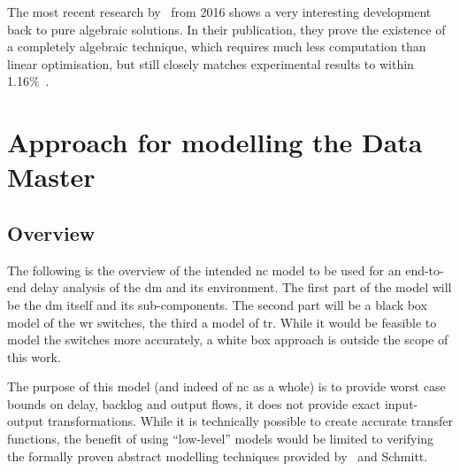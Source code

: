 The most recent research by~\citeauthor{bondorf_delay_2016} from 2016 shows a very interesting development back to pure algebraic solutions. In their publication, they prove the existence of a completely algebraic technique,
which requires much less computation than linear optimisation, but still closely matches experimental results to within 1.16\%~\cite{bondorf_delay_2016}.


\section{Approach for modelling the Data Master}

\subsection{Overview}

The following is the overview of the intended \gls{nc} model to be used for an end-to-end delay analysis of the \gls{dm} and its environment.
The first part of the model will be the \gls{dm} itself and its sub-components. The second part will be a black box model of the \gls{wr} switches, the third a model of \gls{tr}.
While it would be feasible to model the switches more accurately, a white box approach is outside the scope of this work.
\par
The purpose of this model (and indeed of \gls{nc} as a whole) is to provide worst case bounds on delay, backlog and output flows, it does not provide exact input-output transformations. 
While it is technically possible to create accurate transfer functions, the benefit of using \enquote{low-level} models would be limited to verifying the formally proven abstract modelling techniques
provided by~\citeauthor{thiran_network_2001} and Schmitt.
%

